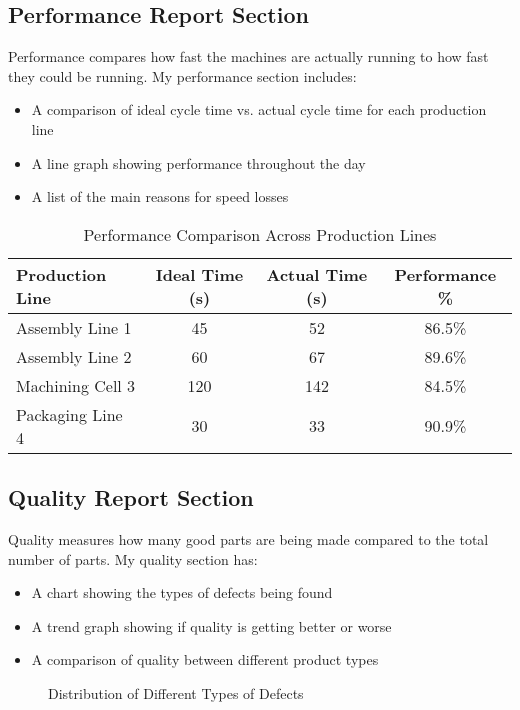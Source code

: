 \documentclass{article}
\begin{document}
\subsection{Performance Report Section}
Performance compares how fast the machines are actually running to how fast they could be running. My performance section includes:

\begin{itemize}
    \item A comparison of ideal cycle time vs. actual cycle time for each production line
    \item A line graph showing performance throughout the day
    \item A list of the main reasons for speed losses
\end{itemize}

\begin{table}[H]
\centering
\caption{Performance Comparison Across Production Lines}
\begin{tabular}{lccc}
\toprule
\textbf{Production Line} & \textbf{Ideal Time (s)} & \textbf{Actual Time (s)} & \textbf{Performance \%} \\
\midrule
Assembly Line 1 & 45 & 52 & 86.5\% \\
Assembly Line 2 & 60 & 67 & 89.6\% \\
Machining Cell 3 & 120 & 142 & 84.5\% \\
Packaging Line 4 & 30 & 33 & 90.9\% \\
\bottomrule
\end{tabular}
\end{table}

\subsection{Quality Report Section}
Quality measures how many good parts are being made compared to the total number of parts. My quality section has:

\begin{itemize}
    \item A chart showing the types of defects being found
    \item A trend graph showing if quality is getting better or worse
    \item A comparison of quality between different product types
\end{itemize}

\begin{figure}[H]
\centering
{}
\caption{Distribution of Different Types of Defects}
\end{figure}
\end{document}
